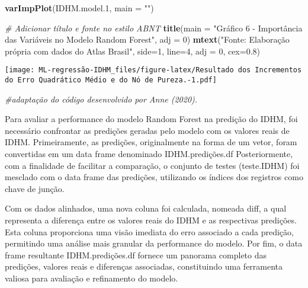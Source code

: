 \documentclass[
]{article}
\newenvironment{Shaded}{\begin{snugshade}}{\end{snugshade}}
\newcommand{\AttributeTok}[1]{\textcolor[rgb]{0.13,0.29,0.53}{#1}}
\newcommand{\CommentTok}[1]{\textcolor[rgb]{0.56,0.35,0.01}{\textit{#1}}}
\newcommand{\DecValTok}[1]{\textcolor[rgb]{0.00,0.00,0.81}{#1}}
\newcommand{\FloatTok}[1]{\textcolor[rgb]{0.00,0.00,0.81}{#1}}
\newcommand{\FunctionTok}[1]{\textcolor[rgb]{0.13,0.29,0.53}{\textbf{#1}}}
\newcommand{\NormalTok}[1]{#1}
\newcommand{\StringTok}[1]{\textcolor[rgb]{0.31,0.60,0.02}{#1}}
\begin{document}
\begin{Shaded}
\begin{Highlighting}[]
\FunctionTok{varImpPlot}\NormalTok{(IDHM.model}\FloatTok{.1}\NormalTok{, }\AttributeTok{main =} \StringTok{""}\NormalTok{)}

\CommentTok{\# Adicionar título e fonte no estilo ABNT}
\FunctionTok{title}\NormalTok{(}\AttributeTok{main =} \StringTok{"Gráfico 6 {-} Importância das Variáveis no Modelo Random Forest"}\NormalTok{, }\AttributeTok{adj =} \DecValTok{0}\NormalTok{)}
\FunctionTok{mtext}\NormalTok{(}\StringTok{"Fonte: Elaboração própria com dados do Atlas Brasil"}\NormalTok{, }\AttributeTok{side=}\DecValTok{1}\NormalTok{, }\AttributeTok{line=}\DecValTok{4}\NormalTok{, }\AttributeTok{adj =} \DecValTok{0}\NormalTok{, }\AttributeTok{cex=}\FloatTok{0.8}\NormalTok{)}
\end{Highlighting}
\end{Shaded}

\texttt{[image: ML-regressão-IDHM\_files/figure-latex/Resultado dos Incrementos do Erro Quadrático Médio e do Nó de Pureza.-1.pdf]}

\begin{Shaded}
\begin{Highlighting}[]
\CommentTok{\#adaptação do código desenvolvido por Anne (2020).}
\end{Highlighting}
\end{Shaded}

Para avaliar a performance do modelo Random Forest na predição do IDHM,
foi necessário confrontar as predições geradas pelo modelo com os
valores reais de IDHM. Primeiramente, as predições, originalmente na
forma de um vetor, foram convertidas em um data frame denominado
IDHM.predições.df Posteriormente, com a finalidade de facilitar a
comparação, o conjunto de testes (teste.IDHM) foi mesclado com o data
frame das predições, utilizando os índices dos registros como chave de
junção.

Com os dados alinhados, uma nova coluna foi calculada, nomeada diff, a
qual representa a diferença entre os valores reais do IDHM e as
respectivas predições. Esta coluna proporciona uma visão imediata do
erro associado a cada predição, permitindo uma análise mais granular da
performance do modelo. Por fim, o data frame resultante
IDHM.predições.df fornece um panorama completo das predições, valores
reais e diferenças associadas, constituindo uma ferramenta valiosa para
avaliação e refinamento do modelo.
\end{document}
